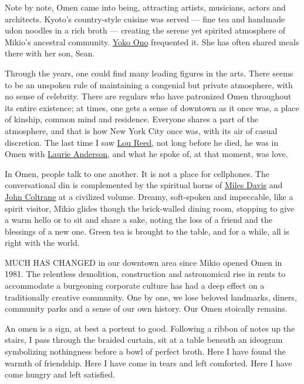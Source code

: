 Note by note, Omen came into being, attracting artists, musicians,
actors and architects. Kyoto's country-style cuisine was served --- fine
tea and handmade udon noodles in a rich broth --- creating the serene
yet spirited atmosphere of Mikio's ancestral community.
\href{https://www.nytimes.com/2015/10/23/t-magazine/yoko-ono-illustrated-interview.html}{Yoko
Ono} frequented it. She has often shared meals there with her son, Sean.

Through the years, one could find many leading figures in the arts.
There seems to be an unspoken rule of maintaining a congenial but
private atmosphere, with no sense of celebrity. There are regulars who
have patronized Omen throughout its entire existence; at times, one gets
a sense of downtown as it once was, a place of kinship, common mind and
residence. Everyone shares a part of the atmosphere, and that is how New
York City once was, with its air of casual discretion. The last time I
saw \href{https://www.nytimes.com/topic/person/lou-reed}{Lou Reed}, not
long before he died, he was in Omen with
\href{https://www.nytimes.com/2018/04/26/t-magazine/larry-clark-laurie-anderson-bill-t-jones-80s-work.html}{Laurie
Anderson}, and what he spoke of, at that moment, was love.

In Omen, people talk to one another. It is not a place for cellphones.
The conversational din is complemented by the spiritual horns of
\href{https://www.nytimes.com/topic/person/miles-davis}{Miles Davis} and
\href{https://www.nytimes.com/topic/person/john-coltrane}{John Coltrane}
at a civilized volume. Dreamy, soft-spoken and impeccable, like a spirit
visitor, Mikio glides though the brick-walled dining room, stopping to
give a warm hello or to sit and share a sake, noting the loss of a
friend and the blessings of a new one. Green tea is brought to the
table, and for a while, all is right with the world.

MUCH HAS CHANGED in our downtown area since Mikio opened Omen in 1981.
The relentless demolition, construction and astronomical rise in rents
to accommodate a burgeoning corporate culture has had a deep effect on a
traditionally creative community. One by one, we lose beloved landmarks,
diners, community parks and a sense of our own history. Our Omen
stoically remains.

An omen is a sign, at best a portent to good. Following a ribbon of
notes up the stairs, I pass through the braided curtain, sit at a table
beneath an ideogram symbolizing nothingness before a bowl of perfect
broth. Here I have found the warmth of friendship. Here I have come in
tears and left comforted. Here I have come hungry and left satisfied.

